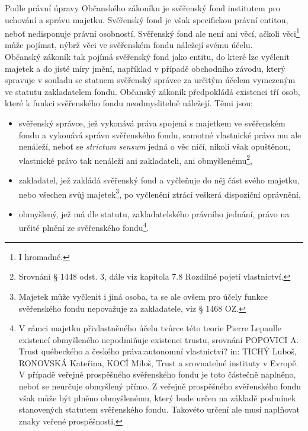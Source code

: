 \documentclass{article}
\begin{document}
Podle právní úpravy Občanského zákoníku je svěřenský fond institutem pro uchování a správu majetku. Svěřenský fond je však specifickou právní entitou, neboť nedisponuje právní osobností. Svěřenský fond ale není ani věcí, ačkoli věci\footnote{I hromadné.} může pojímat, nýbrž věci ve svěřenském fondu náležejí svému účelu.\\

Občanský zákoník tak pojímá svěřenský fond jako entitu, do které lze vyčlenit majetek a do jisté míry  jmění, například v případě obchodního závodu, který spravuje v souladu se statuem svěřenský správce za určitým účelem vymezeným ve statutu zakladatelem fondu. Občanský zákoník předpokládá existenci tří osob, které k funkci svěřenského fondu neodmyslitelně náležejí. Těmi jsou:\\

\begin{itemize}
\item svěřenský správce, jež vykonává práva spojená s majetkem ve svěřenském fondu a vykonává správu svěřenského fondu, samotné vlastnické právo mu ale nenáleží, neboť se \textit{strictum sensum} jedná o věc ničí, nikoli však opuštěnou, vlastnické právo tak nenáleží ani zakladateli, ani obmyšlenému\footnote{Srovnání § 1448 odst. 3, dále viz kapitola 7.8 Rozdílné pojetí vlastnictví.},
\item zakladatel, jež zakládá svěřenský fond a vyčleňuje do něj část svého majetku, nebo všechen svůj majetek\footnote{Majetek může vyčlenit i jiná osoba, ta se ale ovšem pro účely funkce svěřenského fondu nepovažuje za zakladatele, viz § 1468 OZ.}, po vyčlenění ztrácí veškerá dispoziční oprávnění,
\item obmyšlený, jež má dle statutu, zakladatelského právního jednání, právo na určité plnění ze svěřenského fondu\footnote{V rámci majetku přivlastněného účelu tvůrce této teorie Pierre Lepaulle existencí obmyšleného nepodmiňuje existenci trustu, srovnání POPOVICI A. Trust québeckého a českého práva:autonomní vlastnictví? in: TICHÝ Luboš, RONOVSKÁ Kateřina, KOCÍ Miloš, Trust a srovnatelné instituty v Evropě. V případě veřejně prospěšného svěřenského fondu je toto částečně naplněno, neboť se neurčuje obmyšlený přímo. Z veřejně prospěšného svěřenského fondu však může být plněno obmyšlenému, který bude určen na základě podmínek stanovených statutem svěřenského fondu. Takovéto určení ale musí naplňovat znaky veřené prospěšnosti.}.	
\end{itemize}
\end{document}
